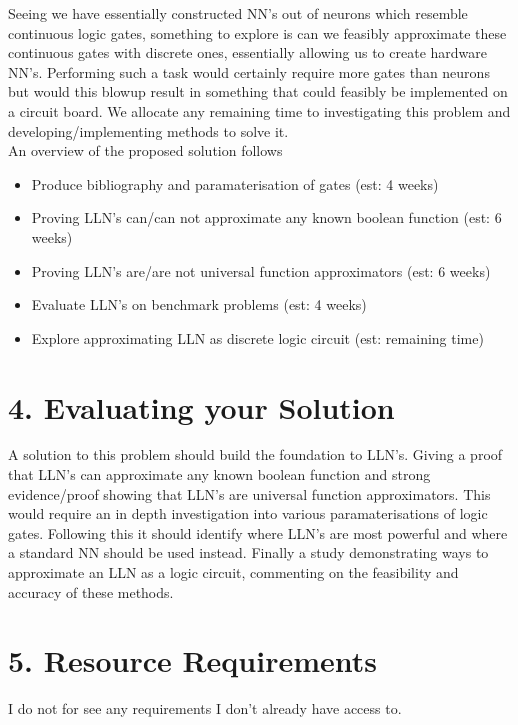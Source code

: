 \documentclass[11pt, a4paper, twoside, openright]{report}
\begin{document}
Seeing we have essentially constructed NN's out of neurons which resemble continuous logic gates, something to explore is can we feasibly approximate these continuous gates with discrete ones, essentially allowing us to create hardware NN's. Performing such a task would certainly require more gates than neurons but would this blowup result in something that could feasibly be implemented on a circuit board. We allocate any remaining time to investigating this problem and developing/implementing methods to solve it.\\

An overview of the proposed solution follows
\begin{itemize}
\item Produce bibliography and paramaterisation of gates (est: 4 weeks)
\item Proving LLN's can/can not approximate any known boolean function (est: 6 weeks)
\item Proving LLN's are/are not universal function approximators (est: 6 weeks)
\item Evaluate LLN's on benchmark problems (est: 4 weeks)
\item Explore approximating LLN as discrete logic circuit (est: remaining time)
\end{itemize}

\section*{4. Evaluating your Solution}

A solution to this problem should build the foundation to LLN's. Giving a proof that LLN's can approximate any known boolean function and strong evidence/proof showing that LLN's are universal function approximators. This would require an in depth investigation into various paramaterisations of logic gates. Following this it should identify where LLN's are most powerful and where a standard NN should be used instead. Finally a study demonstrating ways to approximate an LLN as a logic circuit, commenting on the feasibility and accuracy of these methods.

\section*{5. Resource Requirements}

I do not for see any requirements I don't already have access to.

\backmatter

%


\end{document}
